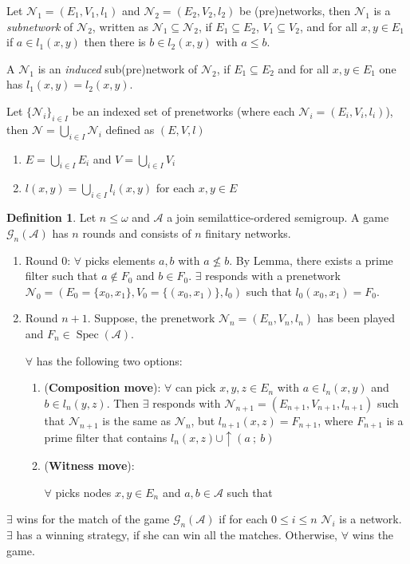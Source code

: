 \documentclass[a4paper]{article}
\theoremstyle{definition}
\newtheorem{definition}{Definition}
\theoremstyle{theorem}
\theoremstyle{proposition}
\theoremstyle{lemma}
\theoremstyle{ex}
\theoremstyle{corollary}
\theoremstyle{claim}
\begin{document}
Let $\mathcal{N}_1 = (E_1, V_1, l_1)$ and $\mathcal{N}_2 = (E_2, V_2, l_2)$ be (pre)networks, then $\mathcal{N}_1$ is a \emph{subnetwork} of $\mathcal{N}_2$, written as $\mathcal{N}_1 \subseteq \mathcal{N}_2$,
if $E_1 \subseteq E_2$, $V_1 \subseteq V_2$, and for all $x, y \in E_1$ if $a \in l_1(x, y)$ then there is $b \in l_2(x, y)$ with $a \leq b$.

A $\mathcal{N}_1$ is an \emph{induced} sub(pre)network of $\mathcal{N}_2$, if $E_1 \subseteq E_2$ and for all $x, y \in E_1$ one has $l_1(x,y) = l_2(x,y)$.

Let $\{ \mathcal{N}_i \}_{i \in I}$ be an indexed set of prenetworks (where each $\mathcal{N}_i = (E_i, V_i, l_i)$), then $\mathcal{N} = \bigcup \limits_{i \in I} \mathcal{N}_i$ defined as $(E, V, l)$

\begin{enumerate}
  \item $E = \bigcup \limits_{i \in I} E_i$ and $V = \bigcup \limits_{i \in I} V_i$
  \item $l(x, y) = \bigcup \limits_{ i \in I } l_i(x, y)$ for each $x, y \in E$
\end{enumerate}

\begin{definition}
  Let $n \leq \omega$ and $\mathcal{A}$ a join semilattice-ordered semigroup. A game $\mathcal{G}_n(\mathcal{A})$ has $n$ rounds and consists of $n$ finitary networks.

  \begin{enumerate}
    \item Round $0$: $\forall$ picks elements $a, b$ with $a \not\leq b$. By Lemma, there exists a prime filter such that $a \not\in F_0$ and $b \in F_0$. $\exists$ responds with a prenetwork $\mathcal{N}_0 = (E_0 = \{ x_0, x_1 \}, V_0 = \{ (x_0, x_1)\}, l_0)$ such that $l_0(x_0, x_1) = F_0$.
    \item Round $n + 1$. Suppose, the prenetwork $\mathcal{N}_n = (E_n, V_n, l_n)$ has been played and $F_n \in \operatorname{Spec}(\mathcal{A})$.

    $\forall$ has the following two options:
    \begin{enumerate}
      \item ({\bf Composition move}): $\forall$ can pick $x, y, z \in E_n$ with $a \in l_n(x, y)$ and $b \in l_n(y, z)$. Then $\exists$ responds with $\mathcal{N}_{n + 1} = (E_{n + 1}, V_{n + 1}, l_{n + 1})$ such that $\mathcal{N}_{n + 1}$
      is the same as $\mathcal{N}_n$, but $l_{n + 1}(x, z) = F_{n+1}$, where $F_{n+1}$ is a prime filter that contains
      $l_{n}(x, z) \cup \uparrow(a \: ; \: b)$
      \item ({\bf Witness move}):

      $\forall$ picks nodes $x, y \in E_n$ and $a, b \in \mathcal{A}$ such that
    \end{enumerate}
  \end{enumerate}

  $\exists$ wins for the match of the game $\mathcal{G}_n(\mathcal{A})$ if for each $0 \leq i \leq n$ $\mathcal{N}_i$ is a network. $\exists$ has a winning strategy, if she can win all the matches. Otherwise, $\forall$ wins the game.
\end{definition}
\end{document}
